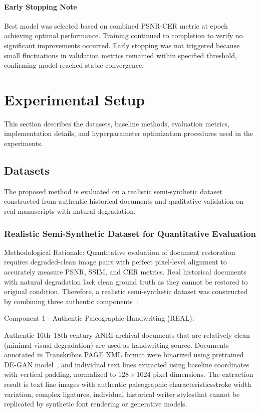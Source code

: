 \documentclass[journal]{IEEEtran}
\begin{document}
\paragraph{Early Stopping Note} Best model was selected based on combined PSNR-CER metric at epoch achieving optimal performance. Training continued to completion to verify no significant improvements occurred. Early stopping was not triggered because small fluctuations in validation metrics remained within specified threshold, confirming model reached stable convergence.

\section{Experimental Setup}

This section describes the datasets, baseline methods, evaluation metrics, implementation details, and hyperparameter optimization procedures used in the experiments.

\subsection{Datasets}

The proposed method is evaluated on a realistic semi-synthetic dataset constructed from authentic historical documents and qualitative validation on real manuscripts with natural degradation.

\subsubsection{Realistic Semi-Synthetic Dataset for Quantitative Evaluation}

Methodological Rationale: Quantitative evaluation of document restoration requires degraded-clean image pairs with perfect pixel-level alignment to accurately measure PSNR, SSIM, and CER metrics. Real historical documents with natural degradation lack clean ground truth as they cannot be restored to original condition. Therefore, a realistic semi-synthetic dataset was constructed by combining three authentic components~\cite{souibgui2021enhance,zhao2019document}:

Component 1 - Authentic Paleographic Handwriting (REAL):

Authentic 16th--18th century ANRI archival documents that are relatively clean (minimal visual degradation) are used as handwriting source. Documents annotated in Transkribus PAGE XML format were binarized using pretrained DE-GAN model~\cite{souibgui2020degan}, and individual text lines extracted using baseline coordinates with vertical padding, normalized to $128 \times 1024$ pixel dimensions. The extraction result is text line images with authentic paleographic characteristics\textemdash stroke width variation, complex ligatures, individual historical writer styles\textemdash that cannot be replicated by synthetic font rendering or generative models.
\end{document}
